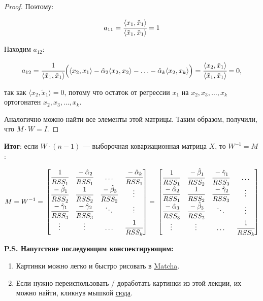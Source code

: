 \documentclass[12pt]{article} %
\theoremstyle{definition} %
\def \hb{\hat{\beta}}
\def \ha{\hat{\alpha}}
\def \hg{\hat{\gamma}}
\def \tx{\tilde{x}}
\begin{document}
\begin{proof}
Поэтому:

\[
    a_{11} = \cfrac{\langle x_1,\tx_1 \rangle}{\langle\tx_1,\tx_1 \rangle} = 1 
\]  

Находим $a_{12}$:

\[   
    a_{12} =
    \cfrac{1}{\langle\tx_1,\tx_1 \rangle} \Big ( \langle x_2, x_1 \rangle - \ha_2  \langle x_2, x_2 \rangle  
    - \ldots -  \ha_k  \langle x_2, x_k \rangle   \Big ) = \\
    \cfrac{\langle x_2,\tx_1 \rangle}{\langle\tx_1,\tx_1 \rangle} = 0,
\]

так как $\langle x_2,\tx_1 \rangle = 0$, потому что остаток от регрессии $x_1$ на $x_2,x_3, \dots, x_k$  ортогонатен $x_2,x_3, \dots, x_k$.

Аналогично можно найти все элементы этой матрицы. Таким образом, получили, что $ M \cdot W = I $.

\end{proof}

 \textbf{Итог}: если $W \cdot (n-1)$  — выборочная ковариационная матрица $X$, то $W^{-1} = M$:
 
 \[ 
 M = W^{-1} = \\
    \begin{bmatrix}
        \cfrac{1}{RSS_1} & \cfrac{-\ha_2}{RSS_1} & \ldots &  \cfrac{- \ha_k}{RSS_1} \\
        \cfrac{-\hb_1}{RSS_2} & \cfrac{1}{RSS_2} & \cfrac{-\hb_3}{RSS_2}  & \vdots \\
        \cfrac{-\hg_1}{RSS_3} & \cfrac{-\hg_2}{RSS_3} & \ddots & \vdots \\
        \vdots & \vdots & \ldots & \cfrac{1}{RSS_k} \\
     \end{bmatrix}
     = \\
    \begin{bmatrix}
        \cfrac{1}{RSS_1} & \cfrac{-\hb_1}{RSS_2} & \cfrac{-\hg_1}{RSS_3} & \ldots \\
        \cfrac{-\ha_2}{RSS_1} & \cfrac{1}{RSS_2} & \cfrac{-\hg_2}{RSS_3}  & \vdots \\
        \cfrac{-\ha_3}{RSS_3} & \cfrac{-\hb_3}{RSS_2} & \ddots & \vdots \\
        \vdots & \vdots & \ldots & \cfrac{1}{RSS_k} \\
     \end{bmatrix}
 \]

\textbf{P.S. Напутствие последующим конспектирующим:}
\begin{enumerate}
    \item Картинки можно легко и быстро рисовать в \href{https://www.mathcha.io}{Matcha}.
    \item Если нужно переиспользовать / доработать картинки из этой лекции, их можно найти, кликнув мышкой \href{https://www.mathcha.io/editor/vqVYT1KFnvu2vIy2}{сюда}.
\end{enumerate}
\end{document}
